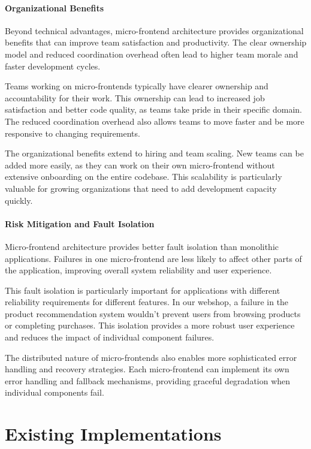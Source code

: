 \documentclass[12pt,a4paper]{report}
\begin{document}
\paragraph{Organizational Benefits}

Beyond technical advantages, micro-frontend architecture provides organizational benefits that can improve team satisfaction and productivity. The clear ownership model and reduced coordination overhead often lead to higher team morale and faster development cycles.

Teams working on micro-frontends typically have clearer ownership and accountability for their work. This ownership can lead to increased job satisfaction and better code quality, as teams take pride in their specific domain. The reduced coordination overhead also allows teams to move faster and be more responsive to changing requirements.

The organizational benefits extend to hiring and team scaling. New teams can be added more easily, as they can work on their own micro-frontend without extensive onboarding on the entire codebase. This scalability is particularly valuable for growing organizations that need to add development capacity quickly.

\paragraph{Risk Mitigation and Fault Isolation}

Micro-frontend architecture provides better fault isolation than monolithic applications. Failures in one micro-frontend are less likely to affect other parts of the application, improving overall system reliability and user experience.

This fault isolation is particularly important for applications with different reliability requirements for different features. In our webshop, a failure in the product recommendation system wouldn't prevent users from browsing products or completing purchases. This isolation provides a more robust user experience and reduces the impact of individual component failures.

The distributed nature of micro-frontends also enables more sophisticated error handling and recovery strategies. Each micro-frontend can implement its own error handling and fallback mechanisms, providing graceful degradation when individual components fail.

\section{Existing Implementations}
\end{document}
